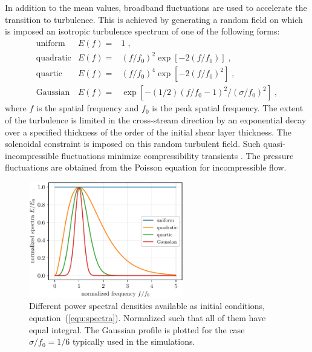 In addition to the mean values, broadband fluctuations are used to accelerate the transition to turbulence. This is achieved by generating a random field on which is imposed an isotropic turbulence spectrum of one of the following forms:
\begin{equation}
  \begin{array}{lll}
    \text{uniform} &    E(f) = &1 \;,\\
    \text{quadratic} &  E(f) = &(f/f_0)^2 \exp[-2 (f/f_0)] \;,\\
    \text{quartic} &    E(f) = &(f/f_0)^4 \exp[-2 (f/f_0)^2] \;,\\
    \text{Gaussian} &   E(f) = & \exp[-(1/2)(f/f_0-1)^2/(\sigma/f_0)^2] \;,
  \end{array}
  \label{equ:spectra}
\end{equation}
where $f$ is the spatial frequency and $f_0$ is the peak spatial frequency. The extent of the turbulence is limited in the cross-stream direction by an exponential decay over a specified thickness of the order of the initial shear layer thickness. The solenoidal constraint is imposed on this random turbulent field. Such quasi-incompressible fluctuations minimize compressibility transients \cite{Erlebacher:1990}. The pressure fluctuations are obtained from the Poisson equation for incompressible flow.

\begin{figure}
  \includegraphics[clip,width=0.6\textwidth]{figs/spectra}
  \caption{Different power spectral densities available as initial conditions, equation~(\ref{equ:spectra}). Normalized such that all of them have equal integral. The Gaussian profile is plotted for the case $\sigma/f_0=1/6$ typically used in the simulations.}
  \label{fig:eq-spc}
\end{figure}


